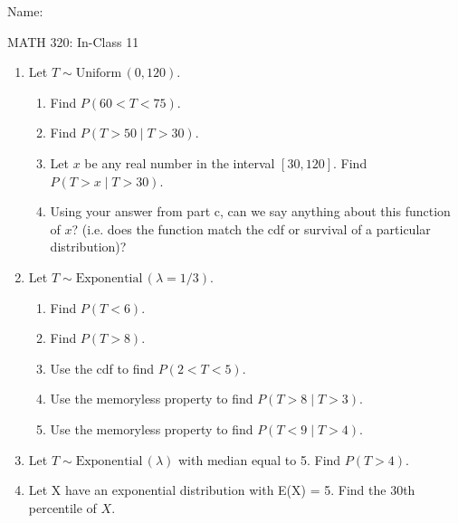 \documentclass{article}
\newcommand{\follow}[1]{\sim \text{#1}\,}		%
\begin{document}
\hspace{375pt}Name:

\begin{center}
{\Huge MATH 320: In-Class 11}

\end{center}
\bigskip\bigskip



\begin{enumerate}
    \item Let $T \follow{Uniform}(0, 120)$.%
    \begin{enumerate}
        \item Find $P(60 < T < 75)$.\vspace{100pt}
        \item Find $P(T > 50 \mid T > 30)$.\vspace{100pt}
        \item Let $x$ be any real number in the interval $[30,120]$. Find $P(T > x \mid T > 30)$.\vspace{100pt}
        \item Using your answer from part c, can we say anything about this function of $x$? (i.e. does the function match the cdf or survival of a particular distribution)?\vspace{60pt}%
    \end{enumerate}\bigskip
    
    \item Let $T \follow{Exponential}(\lambda = 1/3)$.%
    \begin{enumerate}
        \item Find $P(T < 6)$.\vspace{100pt}
        \item Find $P(T > 8)$.\vspace{100pt}
        \item Use the cdf to find $P( 2 < T < 5)$.\vspace{100pt}
        \item Use the memoryless property to find $P(T > 8 \mid T > 3)$.\vspace{100pt}
        \item Use the memoryless property to find $P(T < 9 \mid T > 4)$.\vspace{100pt}
    \end{enumerate}\bigskip
    
    \item Let $T \follow{Exponential}(\lambda)$ with median equal to 5. Find $P(T > 4)$.\vspace{100pt}
    
    \item Let X have an exponential distribution with E(X) = 5. Find the 30th percentile of $X$.%
\end{enumerate}
\end{document}
